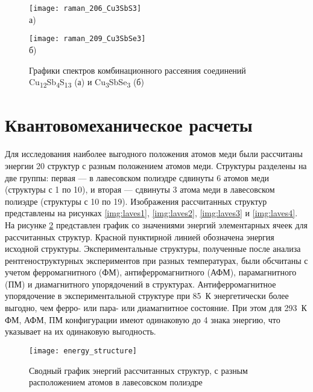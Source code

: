 \begin{figure}[p!]
  \begin{minipage}[ht]{0.9\linewidth}\centering
    \texttt{[image: raman\_206\_Cu3SbS3]} \\ а)
  \end{minipage}
  \vfill
  \begin{minipage}[ht]{0.9\linewidth}\centering
    \texttt{[image: raman\_209\_Cu3SbSe3]} \\ б)
  \end{minipage}

      \caption[Графики спектров комбинационного рассеяния соединений Cu\textsubscript{12}Sb\textsubscript{4}S\textsubscript{13} (а) и Cu\textsubscript{3}SbSe\textsubscript{3} (б)]{Графики спектров комбинационного рассеяния соединений Cu\textsubscript{12}Sb\textsubscript{4}S\textsubscript{13} (а) и Cu\textsubscript{3}SbSe\textsubscript{3} (б)}
    \label{img:raman2}
\end{figure}


\newpage


\section{Квантовомеханическое расчеты} \label{sect3_6}

Для исследования наиболее выгодного положения атомов меди были рассчитаны энергии 20 структур с разным положением атомов меди. 
Структуры разделены на две группы: первая --- в лавесовском полиэдре сдвинуты 6 атомов меди (структуры с 1 по 10), и вторая --- сдвинуты 3 атома меди в лавесовском полиэдре (структуры с 10 по 19). Изображения рассчитанных структур представлены на рисунках \ref{img:laves1}, \ref{img:laves2}, \ref{img:laves3} и \ref{img:laves4}.
На рисунке \ref{img:th} представлен график со значениями энергий элементарных ячеек для рассчитанных структур. Красной пунктирной линией обозначена энергия исходной структуры. 
Экспериментальные структуры, полученные после анализа рентгеноструктурных экспериментов при разных температурах, были обсчитаны с учетом ферромагнитного (ФМ), антиферромагнитного (АФМ), парамагнитного (ПМ) и диамагнитного упорядочений в структурах. 
Антиферромагнитное упорядочение в экспериментальной структуре при 85~К энергетически более выгодно, чем ферро- или пара- или диамагнитное состояние. При этом для 293~К ФМ, АФМ, ПМ конфигурации имеют одинаковую до 4 знака энергию, что указывает на их одинаковую выгодность.

\begin{figure}[ht!]
  \begin{minipage}[ht]{0.9\linewidth}\centering
    \texttt{[image: energy\_structure]} 
  \end{minipage}
  
      \caption[Сводный график энергий рассчитанных структур, с разным расположением атомов в лавесовском полиэдре]{Сводный график энергий рассчитанных структур, с разным расположением атомов в лавесовском полиэдре}
    \label{img:th}
\end{figure}

